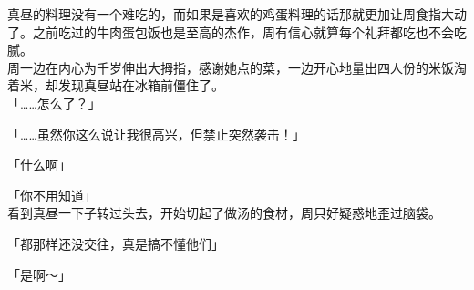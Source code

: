 真昼的料理没有一个难吃的，而如果是喜欢的鸡蛋料理的话那就更加让周食指大动了。之前吃过的牛肉蛋包饭也是至高的杰作，周有信心就算每个礼拜都吃也不会吃腻。\\

周一边在内心为千岁伸出大拇指，感谢她点的菜，一边开心地量出四人份的米饭淘着米，却发现真昼站在冰箱前僵住了。\\

「……怎么了？」

「……虽然你这么说让我很高兴，但禁止突然袭击！」

「什么啊」

「你不用知道」\\

看到真昼一下子转过头去，开始切起了做汤的食材，周只好疑惑地歪过脑袋。\\

\vspace{2\baselineskip}

「都那样还没交往，真是搞不懂他们」

「是啊～」
